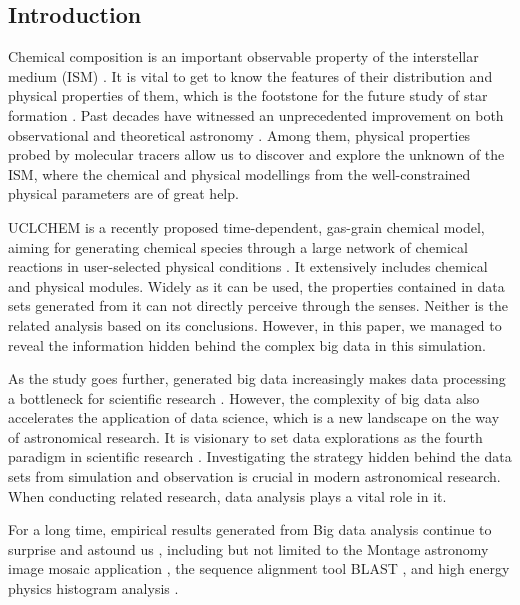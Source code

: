 \documentclass{aa}
\begin{document}
\begin{CJK*}{UTF8}{gbsn}
\section{Introduction}

    Chemical composition is an important observable property of the interstellar medium (ISM) \citep{hollenbach1997dense}. It is vital to get to know the features of their distribution and physical properties of them, which is the footstone for the future study of star formation \citep{huang2017alma}. Past decades have witnessed an unprecedented improvement on both observational \citep{des2002remote,harada2019performance,meier2015alma} and theoretical astronomy \citep{subbotin1968introduction,padmanabhan2002theoretical}. Among them, physical properties probed by molecular tracers \citep{wu2005connecting} allow us to discover and explore the unknown of the ISM, where the chemical and physical modellings from the well-constrained physical parameters are of great help.

    UCLCHEM is a recently proposed time-dependent, gas-grain chemical model, aiming for generating chemical species through a large network of chemical reactions in user-selected physical conditions \citep{holdship2017uclchem}. It extensively includes chemical and physical modules. Widely as it can be used, the properties contained in data sets generated from it can not directly perceive through the senses. Neither is the related analysis based on its conclusions. However, in this paper, we managed to reveal the information hidden behind the complex big data in this simulation. 
   
    As the study goes further, generated big data increasingly makes data processing a bottleneck for scientific research \citep{zhang2015scientific}. 
    However, the complexity of big data also accelerates the application of data science, which is a new landscape on the way of astronomical research. It is visionary to set data explorations as the fourth paradigm in scientific research \citep{gray2005scientific}. Investigating the strategy hidden behind the data sets from simulation and observation is crucial in modern astronomical research. When conducting related research, data analysis plays a vital role in it.
    
    For a long time, empirical results generated from Big data analysis continue to surprise and astound us \citep{feigelson2012big}, including but not limited to the Montage astronomy image mosaic application \citep{jacob2010montage}, the sequence alignment tool BLAST \citep{altschul1990basic}, and high energy physics histogram analysis \citep{ekanayake2008mapreduce}. 
    

\end{CJK*}
\end{document}
